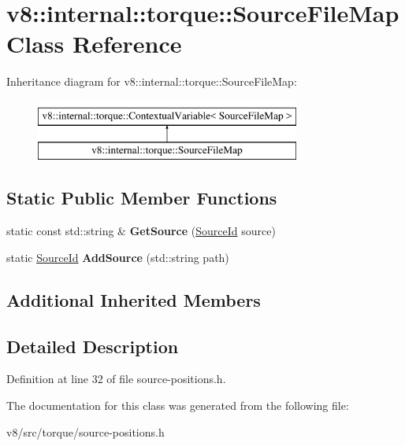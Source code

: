 \hypertarget{classv8_1_1internal_1_1torque_1_1SourceFileMap}{}\section{v8\+:\+:internal\+:\+:torque\+:\+:Source\+File\+Map Class Reference}
\label{classv8_1_1internal_1_1torque_1_1SourceFileMap}
Inheritance diagram for v8\+:\+:internal\+:\+:torque\+:\+:Source\+File\+Map\+:\begin{figure}[H]
\begin{center}
\leavevmode
\includegraphics[height=2.000000cm]{classv8_1_1internal_1_1torque_1_1SourceFileMap}
\end{center}
\end{figure}
\subsection*{Static Public Member Functions}
\begin{DoxyCompactItemize}
\item 
\mbox{\label{classv8_1_1internal_1_1torque_1_1SourceFileMap_a916a3b9edf0783716c01015147fb54f2}} 
static const std\+::string \& {\bfseries Get\+Source} (\mbox{\hyperlink{classv8_1_1internal_1_1torque_1_1SourceId}{Source\+Id}} source)
\item 
\mbox{\label{classv8_1_1internal_1_1torque_1_1SourceFileMap_ac2630e26f15bf6964f6da17b8e1dcfd8}} 
static \mbox{\hyperlink{classv8_1_1internal_1_1torque_1_1SourceId}{Source\+Id}} {\bfseries Add\+Source} (std\+::string path)
\end{DoxyCompactItemize}
\subsection*{Additional Inherited Members}


\subsection{Detailed Description}


Definition at line 32 of file source-\/positions.\+h.



The documentation for this class was generated from the following file\+:\begin{DoxyCompactItemize}
\item 
v8/src/torque/source-\/positions.\+h\end{DoxyCompactItemize}
